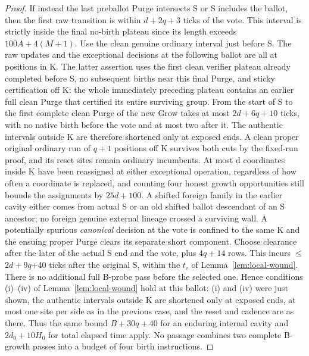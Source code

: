 \begin{proof}
If instead the last preballot Purge intersects S or S includes the ballot, then the first raw transition is within \(d+2q+3\) ticks of the vote. This interval is strictly inside the final no-birth plateau since its length exceeds \(100A+4(M+1)\). Use the clean genuine ordinary interval just before S. The raw updates and the exceptional decisions at the following ballot are all at positions in K. The latter assertion uses the first clean verifier plateau already completed before S, no subsequent births near this final Purge, and sticky certification off K: the whole immediately preceding plateau contains an earlier full clean Purge that certified its entire surviving group. From the start of S to the first complete clean Purge of the new Grow takes at most \(2d+6q+10\) ticks, with no native birth before the vote and at most two after it. The authentic intervals outside K are therefore shortened only at exposed ends. A clean proper original ordinary run of \(q+1\) positions off K survives both cuts by the fixed-run proof, and its reset sites remain ordinary incumbents. At most d coordinates inside K have been reassigned at either exceptional operation, regardless of how often a coordinate is replaced, and counting four honest growth opportunities still bounds the assignments by \(25d+100\). A shifted foreign family in the earlier cavity either comes from actual S or an old shifted ballot descendant of an S ancestor; no foreign genuine external lineage crossed a surviving wall. A potentially spurious \emph{canonical} decision at the vote is confined to the same K and the ensuing proper Purge clears its separate short component. Choose clearance after the later of the actual S end and the vote, plus \(4q+14\) rows. This incurs \(\le\)\(2d+9q\)+40 ticks after the original S, within the \(t_c\) of Lemma~\ref{lem:local-wound}. There is no additional full B-probe pass before the selected one. Hence conditions (i)--(iv) of Lemma~\ref{lem:local-wound} hold at this ballot: (i) and (iv) were just shown, the authentic intervals outside K are shortened only at exposed ends, at most one site per side as in the previous case, and the reset and cadence are as there. Thus the same bound \(B+30q+40\) for an enduring internal cavity and \(2d_0+10H_0\) for total elapsed time apply. No passage combines two complete B-growth passes into a budget of four birth instructions.


\end{proof}
